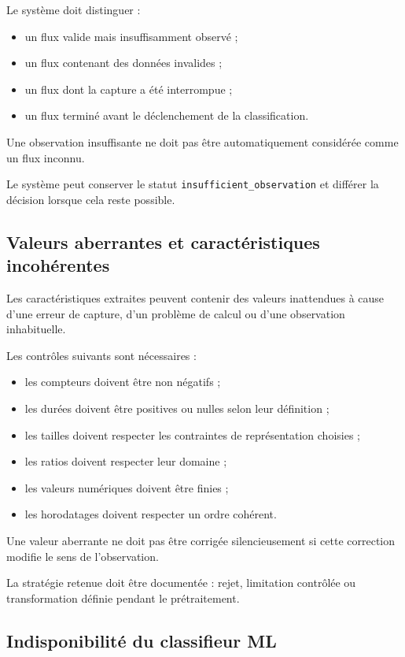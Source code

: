 Le système doit distinguer :

\begin{itemize}
    \item un flux valide mais insuffisamment observé ;
    \item un flux contenant des données invalides ;
    \item un flux dont la capture a été interrompue ;
    \item un flux terminé avant le déclenchement de la classification.
\end{itemize}

Une observation insuffisante ne doit pas être automatiquement considérée comme un flux inconnu.

Le système peut conserver le statut \texttt{insufficient\_observation} et différer la décision lorsque cela reste possible.

\subsection{Valeurs aberrantes et caractéristiques incohérentes}

Les caractéristiques extraites peuvent contenir des valeurs inattendues à cause d'une erreur de capture, d'un problème de calcul ou d'une observation inhabituelle.

Les contrôles suivants sont nécessaires :

\begin{itemize}
    \item les compteurs doivent être non négatifs ;
    \item les durées doivent être positives ou nulles selon leur définition ;
    \item les tailles doivent respecter les contraintes de représentation choisies ;
    \item les ratios doivent respecter leur domaine ;
    \item les valeurs numériques doivent être finies ;
    \item les horodatages doivent respecter un ordre cohérent.
\end{itemize}

Une valeur aberrante ne doit pas être corrigée silencieusement si cette correction modifie le sens de l'observation.

La stratégie retenue doit être documentée : rejet, limitation contrôlée ou transformation définie pendant le prétraitement.

\subsection{Indisponibilité du classifieur ML}

